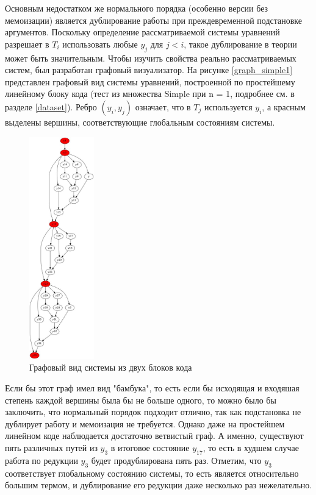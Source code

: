 \documentclass[../diploma.tex]{subfiles}
\begin{document}
Основным недостатком же нормального порядка (особенно версии без мемоизации) является дублирование работы при преждевременной подстановке аргументов. Поскольку определение рассматриваемой системы уравнений разрешает в $T_i$ использовать любые $y_j$ для $j < i$, такое дублирование в теории может быть значительным. Чтобы изучить свойства реально рассматриваемых систем, был разработан графовый визуализатор. На рисунке \ref{graph_simple1} представлен графовый вид системы уравнений, построенной по простейшему линейному блоку кода (тест из множества Simple при n = 1, подробнее см. в разделе \ref{dataset}). Ребро $(y_i, y_j)$ означает, что в $T_j$ используется $y_i$, а красным выделены вершины, соответствующие глобальным состояниям системы.

\begin{figure}
    \centering
    \includegraphics[width=0.25\textwidth]{graph_simple2.jpeg}
    \caption{Графовый вид системы из двух блоков кода}\label{graph_simple2}
\end{figure}

Если бы этот граф имел вид "бамбука", то есть если бы исходящая и входяшая степень каждой вершины была бы не больше одного, то можно было бы заключить, что нормальный порядок подходит отлично, так как подстановка не дублирует работу и мемоизация не требуется. Однако даже на простейшем линейном коде наблюдается достаточно ветвистый граф. А именно, существуют пять различных путей из $y_3$ в итоговое состояние $y_{17}$, то есть в худшем случае работа по редукции $y_3$ будет продублирована пять раз. Отметим, что $y_3$ соответствует глобальному состоянию системы, то есть является относительно большим термом, и дублирование его редукции даже несколько раз нежелательно.
\end{document}
